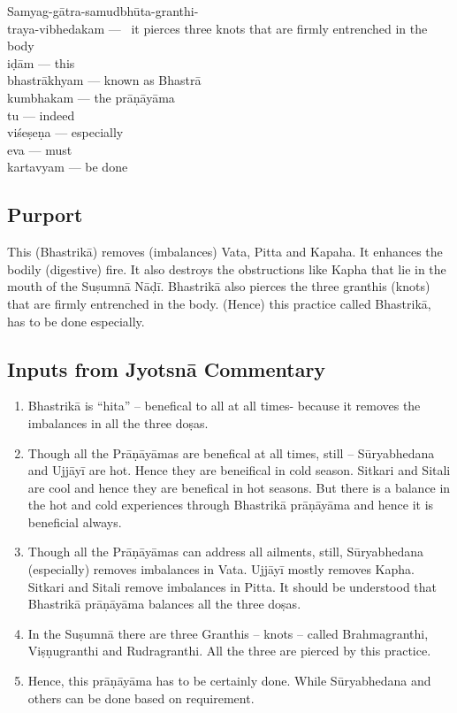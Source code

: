 \begin{multicols}{2}
Samyag-gātra-samudbhūta-granthi-\\
traya-vibhedakam ---  it  pierces three knots that are firmly entrenched  in the body\\
iḍām  --- this \\
bhastrākhyam --- known as Bhastrā\\
kumbhakam --- the prāṇāyāma \\
tu --- indeed \\
viśeṣeṇa --- especially \\
eva --- must \\
kartavyam --- be done
\end{multicols}

\subsection*{Purport}


This (Bhastrikā) removes (imbalances) Vata, Pitta and Kapaha. It enhances the bodily (digestive) fire. It also destroys the obstructions like Kapha that lie in the mouth of the Suṣumnā Nāḍī. Bhastrikā also pierces the three granthis (knots) that are firmly entrenched in the body. (Hence) this practice called Bhastrikā, has to be done especially.

\subsection*{Inputs from Jyotsnā Commentary}


\begin{enumerate}
\item Bhastrikā is “hita” – benefical to all at all times- because it removes the imbalances in all the three doṣas. 
\item Though all the Prāṇāyāmas are benefical at all times, still – Sūryabhedana and Ujjāyī are hot. Hence they are beneifical in cold season. Sitkari and Sitali are cool and hence they are benefical in hot seasons.  But there is a balance in the hot and cold experiences through Bhastrikā prāṇāyāma and hence it is beneficial always. 
\item Though all the Prāṇāyāmas can address all ailments, still, Sūryabhedana (especially) removes imbalances in Vata. Ujjāyī mostly removes Kapha. Sitkari and Sitali remove imbalances in Pitta. It should be understood that Bhastrikā prāṇāyāma balances all the three doṣas.  
\item In the Suṣumnā there are three Granthis – knots – called Brahmagranthi, Viṣṇugranthi and Rudragranthi.  All the three are pierced by this practice. 
\item Hence, this prāṇāyāma has to be certainly done. While Sūryabhedana and others can be done based on requirement.
\end{enumerate}
\newpage
    
